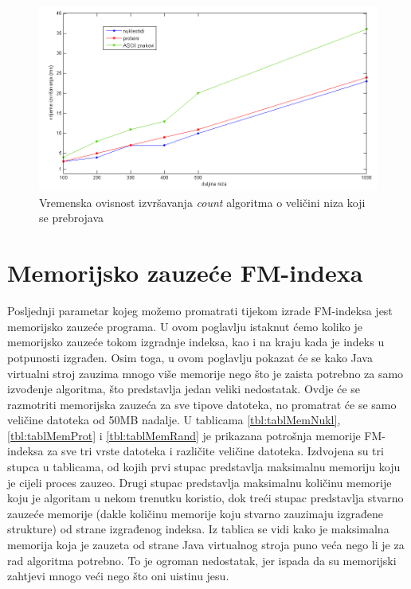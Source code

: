 \begin{figure}[H]
   \centering
       \includegraphics[width=\textwidth]{./pictures/test_count.png}
 \caption{Vremenska ovisnost izvršavanja \emph{count} algoritma o veličini niza koji se prebrojava}
 \label{fig:test_count}
\end{figure}


\section{Memorijsko zauzeće FM-indexa}

Posljednji parametar kojeg možemo promatrati tijekom izrade FM-indeksa jest memorijsko zauzeće programa. U ovom poglavlju istaknut ćemo koliko je memorijsko zauzeće tokom izgradnje indeksa, kao i na kraju kada je indeks u potpunosti izgrađen. Osim toga, u ovom poglavlju pokazat će se kako Java virtualni stroj zauzima mnogo više memorije nego što je zaista potrebno za samo izvođenje algoritma, što predstavlja jedan veliki nedostatak. Ovdje će se razmotriti memorijska zauzeća za sve tipove datoteka, no promatrat će se samo veličine datoteka od 50MB nadalje. U tablicama \ref{tbl:tablMemNukl}, \ref{tbl:tablMemProt} i \ref{tbl:tablMemRand} je prikazana potrošnja memorije FM-indeksa za sve tri vrste datoteka i različite veličine datoteka. Izdvojena su tri stupca u tablicama, od kojih prvi stupac predstavlja maksimalnu memoriju koju je cijeli proces zauzeo. Drugi stupac predstavlja maksimalnu količinu memorije koju je algoritam u nekom trenutku koristio, dok treći stupac predstavlja stvarno zauzeće memorije (dakle količinu memorije koju stvarno zauzimaju izgrađene strukture) od strane izgrađenog indeksa. Iz tablica se vidi kako je maksimalna memorija koja je zauzeta od strane Java virtualnog stroja puno veća nego li je za rad algoritma potrebno. To je ogroman nedostatak, jer ispada da su memorijski zahtjevi mnogo veći nego što oni uistinu jesu.


